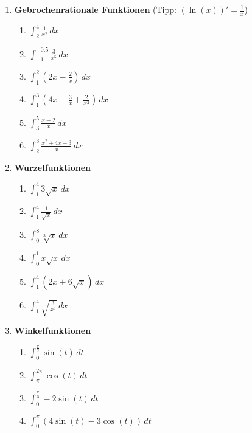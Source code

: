 \begin{ueb}
\begin{enumerate}
		\item \textbf{Gebrochenrationale Funktionen} (Tipp: $\left(\ln(x)\right)'= \frac{1}{x}$)
		      \begin{enumerate}
			      \item \(\displaystyle \int_2^4 \frac{1}{x^2} \, dx \)
			      \item \(\displaystyle \int_{-1}^{-0.5} \frac{3}{x^5} \, dx \)
			      \item \(\displaystyle \int_1^2 \left( 2x - \frac{2}{x} \right) \, dx \)
			      \item \(\displaystyle \int_1^3 \left( 4x - \frac{3}{x} + \frac{2}{x^2} \right) \, dx \)
			      \item \(\displaystyle \int_3^5 \frac{x - 2}{x} \, dx \)
			      \item \(\displaystyle \int_2^3 \frac{x^2 + 4x + 3}{x} \, dx \)
		      \end{enumerate}

		\item \textbf{Wurzelfunktionen}
		      \begin{enumerate}
			      \item \(\displaystyle \int_1^4 3\sqrt{x} \, dx \)
			      \item \(\displaystyle \int_1^4 \frac{1}{\sqrt{x}} \, dx \)
			      \item \(\displaystyle \int_0^8 \sqrt[3]{x} \, dx \)
			      \item \(\displaystyle \int_0^1 x\sqrt{x} \, dx \)
			      \item \(\displaystyle \int_1^4 (2x + 6\sqrt{x}) \, dx \)
			      \item \(\displaystyle \int_1^4 \sqrt{\frac{3}{x^3}} \, dx \)
		      \end{enumerate}

		\item \textbf{Winkelfunktionen}
		      \begin{enumerate}
			      \item \(\displaystyle \int_0^{\frac{\pi}{2}} \sin(t) \, dt \)
			      \item \(\displaystyle \int_\pi^{2\pi} \cos(t) \, dt \)
			      \item \(\displaystyle \int_0^{\frac{\pi}{3}} -2\sin(t) \, dt \)
			      \item \(\displaystyle \int_0^{\pi} (4\sin(t) - 3\cos(t)) \, dt \)
		      \end{enumerate}


\end{enumerate}
\end{ueb}
